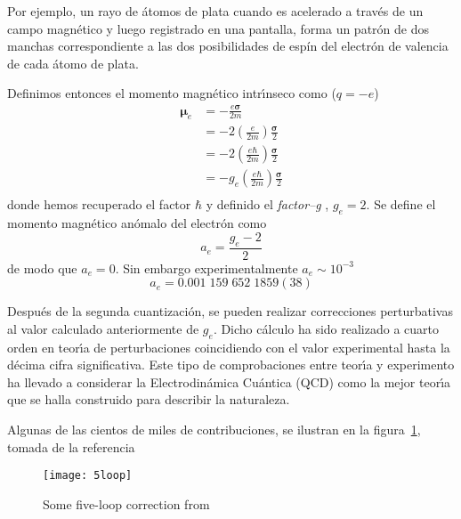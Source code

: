 \begin{frame}
  Por ejemplo, un rayo de átomos de plata  cuando es acelerado a través de un campo magnético y luego registrado en una pantalla, forma un patrón de dos manchas correspondiente a las dos posibilidades de espín del electrón de valencia de cada átomo de plata.
\end{frame}


\begin{frame}
Definimos entonces el momento magn\'etico intr\'\i nseco como ($q=-e$)
\begin{align}
  \boldsymbol{\mu}_e&=-\frac{e\boldsymbol{\sigma}}{2m}\nonumber\\
  &=-2\left(\frac{e}{2m}\right)\frac{\boldsymbol{\sigma}}{2}\nonumber\\
  &=-2\left(\frac{e\hbar}{2m}\right)\frac{\boldsymbol{\sigma}}{2}\nonumber\\
  &=-g_e\left(\frac{e\hbar}{2m}\right)\frac{\boldsymbol{\sigma}}{2}\nonumber\\
\end{align}
donde hemos recuperado el factor $\hbar$ y definido el \emph{factor--g} \cite{spin},  $g_e=2$. Se define el momento magn\'etico an\'omalo del electr\'on como
\begin{equation}
  a_e=\frac{g_e-2}{2}
\end{equation}
de modo que $a_e=0$. Sin embargo experimentalmente $a_e\sim10^{-3}$
\begin{equation}
  a_e=0.001\;159\;652\;1859(38)
\end{equation}
\end{frame}
Despu\'es de la segunda cuantizaci\'on, se pueden realizar correcciones perturbativas al valor calculado anteriormente de $g_e$. Dicho c\'alculo ha sido realizado a cuarto orden en teor\'\i a de perturbaciones coincidiendo con el valor experimental hasta la d\'ecima cifra significativa. Este tipo de comprobaciones entre teor\'\i a y experimento ha llevado a considerar la Electrodin\'amica Cu\'antica (QCD) como la mejor teor\'\i a que se halla construido para describir la naturaleza.

\begin{frame}
Algunas de las cientos de miles de contribuciones, se ilustran en la figura~\ref{fig:5loop}, tomada de la referencia~\cite{Aoyama:2019ryr}
\begin{figure}
  \centering
  \texttt{[image: 5loop]}
  \caption{Some five-loop correction from~\cite{Aoyama:2019ryr}}
  \label{fig:5loop}
\end{figure}
\end{frame}

